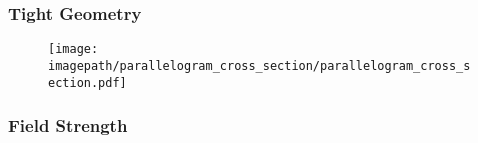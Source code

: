 \begin{frame}
    \frametitle{Tight Geometry}
    \begin{figure}
        \texttt{[image: \\imagepath/parallelogram\_cross\_section/parallelogram\_cross\_section.pdf]}
    \end{figure}
\end{frame}

\begin{frame}
    \frametitle{Field Strength}
\end{frame}

